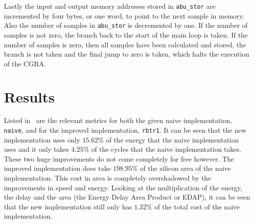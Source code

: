 \documentclass[10pt,twocolumn]{article}
\begin{document}
Lastly the input and output memory addresses stored in
\texttt{abu\_stor} are incremented by four bytes, or one word, to
point to the next sample in memory. Also the number of samples in
\texttt{abu\_stor} is decremented by one. If the number of samples is
not zero, the branch back to the start of the main loop is taken. If
the number of samples is zero, then all samples have been calculated
and stored, the branch is not taken and the final jump to zero is
taken, which halts the execution of the CGRA.


\section{Results}
\label{sec:results}
\begin{table}
  \centering
  \caption{Different metrics for the naive implementation and the
    improved implementation.}
  \label{tbl:results}
\end{table}

Listed in~ are the relevant metrics for both the
given naive implementation, \texttt{naive}, and for the improved
implementation, \texttt{rbtr1}. It can be seen that the new
implementation uses only $15.62\%$ of the energy that the naive
implementation uses and it only takes $4.25\%$ of the cycles that the
naive implementation takes. These two huge improvements do not come
completely for free however. The improved implementation does take
$198.95\%$ of the silicon area of the naive implementation. This cost
in area is completely overshadowed by the improvements in speed and
energy. Looking at the multiplication of the energy, the delay and the
area (the Energy Delay Area Product or EDAP), it can be seen that the
new implementation still only has $1.32\%$ of the total cost of the
naive implementation.
\end{document}
